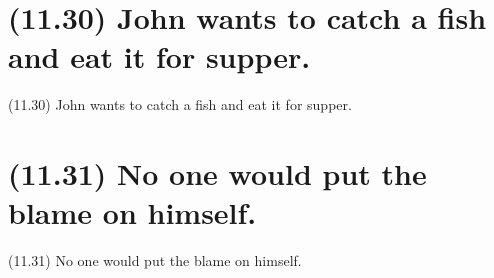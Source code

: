 \documentclass{article}
\begin{document}
\clearpage

%
%

\section*{(11.30) John wants to catch a fish and eat it for supper.}

\bigbreak
\begin{enumerate*}
\item[(11.30)] John wants to catch a fish and eat it for supper.
\end{enumerate*}
\bigbreak

\bigbreak
\begin{minipage}{\textwidth}
\end{minipage}
\bigbreak

\clearpage

%
%

\section*{(11.31) No one would put the blame on himself.}

\bigbreak
\begin{enumerate*}
\item[(11.31)] No one would put the blame on himself.
\end{enumerate*}
\bigbreak

\bigbreak
\begin{minipage}{\textwidth}
\end{minipage}
\bigbreak
\end{document}

